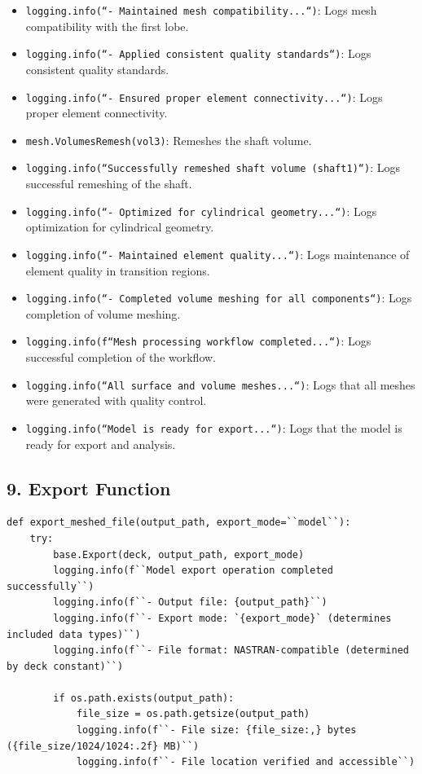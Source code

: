 \documentclass{book}
\begin{document}
\begin{itemize}[leftmargin=*,label=\textbullet]
\begin{itemize}
    \item \texttt{logging.info(``- Maintained mesh compatibility...``)}: Logs mesh compatibility with the first lobe.
    \item \texttt{logging.info(``- Applied consistent quality standards``)}: Logs consistent quality standards.
    \item \texttt{logging.info(``- Ensured proper element connectivity...``)}: Logs proper element connectivity.
    \item \texttt{mesh.VolumesRemesh(vol3)}: Remeshes the shaft volume.
    \item \texttt{logging.info(``Successfully remeshed shaft volume (shaft1)``)}: Logs successful remeshing of the shaft.
    \item \texttt{logging.info(``- Optimized for cylindrical geometry...``)}: Logs optimization for cylindrical geometry.
    \item \texttt{logging.info(``- Maintained element quality...``)}: Logs maintenance of element quality in transition regions.
    \item \texttt{logging.info(``- Completed volume meshing for all components``)}: Logs completion of volume meshing.
    \item \texttt{logging.info(f``Mesh processing workflow completed...``)}: Logs successful completion of the workflow.
    \item \texttt{logging.info(``All surface and volume meshes...``)}: Logs that all meshes were generated with quality control.
    \item \texttt{logging.info(``Model is ready for export...``)}: Logs that the model is ready for export and analysis.
\end{itemize}

\subsection*{9. Export Function}
\begin{lstlisting}[caption={Export Function},label={lst:export}]
def export_meshed_file(output_path, export_mode=``model``):
    try:
        base.Export(deck, output_path, export_mode)
        logging.info(f``Model export operation completed successfully``)
        logging.info(f``- Output file: {output_path}``)
        logging.info(f``- Export mode: `{export_mode}` (determines included data types)``)
        logging.info(f``- File format: NASTRAN-compatible (determined by deck constant)``)

        if os.path.exists(output_path):
            file_size = os.path.getsize(output_path)
            logging.info(f``- File size: {file_size:,} bytes ({file_size/1024/1024:.2f} MB)``)
            logging.info(f``- File location verified and accessible``)


\end{lstlisting}
\end{itemize}
\end{document}
